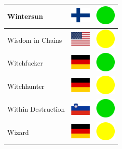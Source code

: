 \documentclass[12pt, a4paper, twoside]{report}
\begin{document}
\begin{center}
\begin{longtable}{|p{5cm}|p{2cm}|p{2cm}|}
Wintersun & \includegraphics[width=1cm]{4x3/fi} & \includegraphics[width=1cm]{likes/y} \\ \hline
Wisdom in Chains & \includegraphics[width=1cm]{4x3/us} & \includegraphics[width=1cm]{likes/m} \\ \hline
Witchfucker & \includegraphics[width=1cm]{4x3/de} & \includegraphics[width=1cm]{likes/y} \\ \hline
Witchhunter & \includegraphics[width=1cm]{4x3/de} & \includegraphics[width=1cm]{likes/m} \\ \hline
Within Destruction & \includegraphics[width=1cm]{4x3/si} & \includegraphics[width=1cm]{likes/y} \\ \hline
Wizard & \includegraphics[width=1cm]{4x3/de} & \includegraphics[width=1cm]{likes/m} \\ \hline

\end{longtable}
\end{center}
\end{document}
